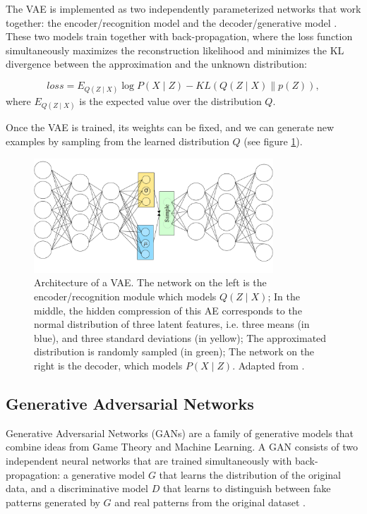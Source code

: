 \documentclass[runningheads]{llncs}
\begin{document}
The VAE is implemented as two independently parameterized networks that work together: the encoder/recognition model and the decoder/generative model \cite{bengio2017deep}. These two models train together with back-propagation, where the loss function simultaneously maximizes the reconstruction likelihood and minimizes the KL divergence between the approximation and the unknown distribution:

\begin{equation}
    loss = E_{Q(Z \mid X)} \log P(X \mid Z)-K L(Q(Z \mid X) \| p(Z)),
\end{equation}
where  \(E_{Q(Z \mid X)}\) is the expected value over the distribution \(Q\).
\newline

Once the VAE is trained, its weights can be fixed, and we can generate new examples by sampling from the learned distribution \(Q\) (see figure \ref{fig:VAE}).

\begin{figure}[h]
    \centering
    \includegraphics[width=0.8\textwidth]{introduction/img/VAE.png}
    \caption{Architecture of a VAE. The network on the left is the encoder/recognition module which models \(Q(Z \mid X)\); In the middle, the hidden compression of this AE corresponds to the normal distribution of three latent features, i.e. three means (in blue), and three standard deviations (in yellow); The approximated distribution is randomly sampled (in green); The network on the right is the decoder, which models \(P(X \mid Z)\). Adapted from \cite{shafkat2018VAE}.}
\label{fig:VAE}
\end{figure}

\subsection{Generative Adversarial Networks}
\label{sec:gen_GANs}
Generative Adversarial Networks (GANs) are a family of generative models that combine ideas from Game Theory and Machine Learning. A GAN consists of two independent neural networks that are trained simultaneously with back-propagation: a generative model $G$ that learns the distribution of the original data, and a discriminative model $D$ that learns to distinguish between fake patterns generated by $G$ and real patterns from the original dataset \cite{goodfellow2014generative}.
\end{document}
